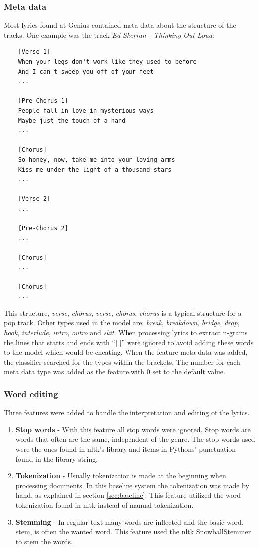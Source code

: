 \documentclass[a4paper, 12pt]{article}
\begin{document}
\subsubsection*{Meta data}
Most lyrics found at Genius contained meta data about the structure of the tracks.
One example was the track \textit{Ed Sherran - Thinking Out Loud}: \cite{ed_thinking}

\begin{verbatim}
    [Verse 1]
    When your legs don't work like they used to before
    And I can't sweep you off of your feet
    ...

    [Pre-Chorus 1]
    People fall in love in mysterious ways
    Maybe just the touch of a hand
    ...

    [Chorus]
    So honey, now, take me into your loving arms
    Kiss me under the light of a thousand stars
    ...

    [Verse 2]
    ...

    [Pre-Chorus 2]
    ...

    [Chorus]
    ...

    [Chorus]
    ...

\end{verbatim}

This structure, \textit{verse}, \textit{chorus}, \textit{verse}, \textit{chorus}, \textit{chorus} is a typical structure for a pop track.
Other types used in the model are: \textit{break}, \textit{breakdown}, \textit{bridge}, \textit{drop}, \textit{hook}, \textit{interlude}, \textit{intro}, \textit{outro} and \textit{skit}.
When processing lyrics to extract n-grams the lines that starts and ends with ``[ ]'' were ignored to avoid adding these words to the model which would be cheating.
When the feature meta data was added, the classifier searched for the types within the brackets.
The number for each meta data type was added as the feature with 0 set to the default value.

\subsubsection*{Word editing}
Three features were added to handle the interpretation and editing of the lyrics.
\begin{enumerate}
    \item {\textbf{Stop words} - With this feature all stop words were ignored.
    Stop words are words that often are the same, independent of the genre.
    The stop words used were the ones found in nltk's library and items in Pythons' punctuation found in the library string.}
    \item {\textbf{Tokenization} - Usually tokenization is made at the beginning when processing documents.
    In this baseline system the tokenization was made by hand, as explained in section \ref{sec:baseline}.
    This feature utilized the word tokenization found in nltk instead of manual tokenization.}
    \item {\textbf{Stemming} - In regular text many words are inflected and the basic word, stem, is often the wanted word.
    This feature used the nltk SnowballStemmer to stem the words.}
\end{enumerate}
\end{document}
